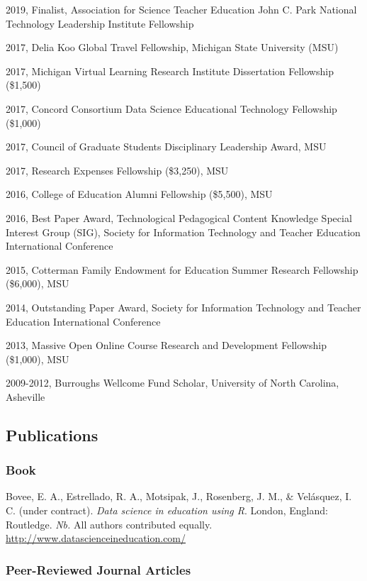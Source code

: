 \documentclass[14,]{article}
\begin{document}
2019, Finalist, Association for Science Teacher Education John C. Park
National Technology Leadership Institute Fellowship

2017, Delia Koo Global Travel Fellowship, Michigan State University
(MSU)

2017, Michigan Virtual Learning Research Institute Dissertation
Fellowship (\$1,500)

2017, Concord Consortium Data Science Educational Technology Fellowship
(\$1,000)

2017, Council of Graduate Students Disciplinary Leadership Award, MSU

2017, Research Expenses Fellowship (\$3,250), MSU

2016, College of Education Alumni Fellowship (\$5,500), MSU

2016, Best Paper Award, Technological Pedagogical Content Knowledge
Special Interest Group (SIG), Society for Information Technology and
Teacher Education International Conference

2015, Cotterman Family Endowment for Education Summer Research
Fellowship (\$6,000), MSU

2014, Outstanding Paper Award, Society for Information Technology and
Teacher Education International Conference

2013, Massive Open Online Course Research and Development Fellowship
(\$1,000), MSU

2009-2012, Burroughs Wellcome Fund Scholar, University of North
Carolina, Asheville

\hypertarget{publications}{%
\subsection{Publications}\label{publications}}

\hypertarget{book}{%
\subsubsection{Book}\label{book}}

Bovee, E. A., Estrellado, R. A., Motsipak, J., Rosenberg, J. M., \&
Velásquez, I. C. (under contract). \emph{Data science in education using
R}. London, England: Routledge. \emph{Nb.} All authors contributed
equally. \url{http://www.datascienceineducation.com/}

\hypertarget{peer-reviewed-journal-articles}{%
\subsubsection{Peer-Reviewed Journal
Articles}\label{peer-reviewed-journal-articles}}
\end{document}
